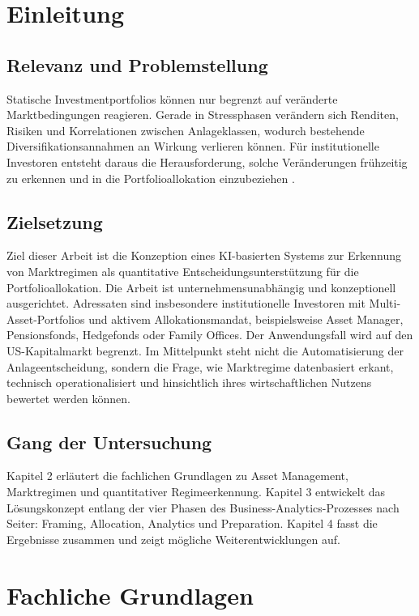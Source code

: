 \section{Einleitung}

\subsection{Relevanz und Problemstellung}
Statische Investmentportfolios können nur begrenzt auf veränderte Marktbedingungen reagieren. Gerade in Stressphasen verändern sich Renditen, Risiken und Korrelationen zwischen Anlageklassen, wodurch bestehende Diversifikationsannahmen an Wirkung verlieren können. Für institutionelle Investoren entsteht daraus die Herausforderung, solche Veränderungen frühzeitig zu erkennen und in die Portfolioallokation einzubeziehen \cite{ang_regime_2012}.

\subsection{Zielsetzung}
Ziel dieser Arbeit ist die Konzeption eines KI-basierten Systems zur Erkennung von Marktregimen als quantitative Entscheidungsunterstützung für die Portfolioallokation. Die Arbeit ist unternehmensunabhängig und konzeptionell ausgerichtet. Adressaten sind insbesondere institutionelle Investoren mit Multi-Asset-Portfolios und aktivem Allokationsmandat, beispielsweise Asset Manager, Pensionsfonds, Hedgefonds oder Family Offices. Der Anwendungsfall wird auf den US-Kapitalmarkt begrenzt. Im Mittelpunkt steht nicht die Automatisierung der Anlageentscheidung, sondern die Frage, wie Marktregime datenbasiert erkant, technisch operationalisiert und hinsichtlich ihres wirtschaftlichen Nutzens bewertet werden können.

\subsection{Gang der Untersuchung}
Kapitel 2 erläutert die fachlichen Grundlagen zu Asset Management, Marktregimen und quantitativer Regimeerkennung. Kapitel 3 entwickelt das Lösungskonzept entlang der vier Phasen des Business-Analytics-Prozesses nach Seiter: Framing, Allocation, Analytics und Preparation. Kapitel 4 fasst die Ergebnisse zusammen und zeigt mögliche Weiterentwicklungen auf.

\section{Fachliche Grundlagen}

